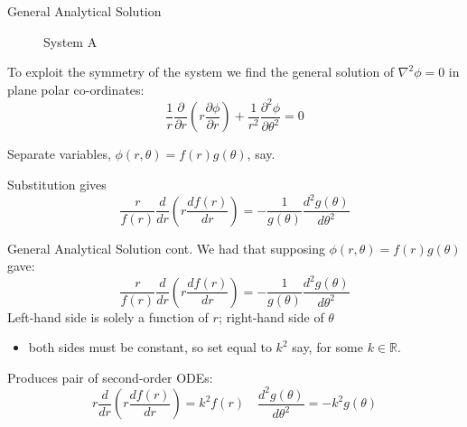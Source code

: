 \documentclass{beamer}
\newcommand{\be}{\begin{equation}}
\newcommand{\ee}{\end{equation}}
\begin{document}
\begin{frame}{General Analytical Solution}
\begin{figure}
\centering
	\caption{System A}
\end{figure}

To exploit the symmetry of the system we find the general solution of $\nabla^2 \phi=0$
in plane polar co-ordinates: 
%
\be
\frac{1}{r}\frac{\partial}{\partial r}(r \frac{\partial \phi}{\partial r}) + \frac{1}{r^2}\frac{\partial ^2 \phi}{\partial \theta^2} = 0 
\ee

Separate variables, $\phi(r,\theta)=f(r)g(\theta)$, say.

Substitution gives
%
\be
\frac{r}{f(r)}\frac{d}{dr}(r \frac{df(r)}{dr}) =- \frac{1}{g(\theta)}\frac{d^2 g(\theta)}{d \theta^2}
\ee

\end{frame}

\begin{frame}{General Analytical Solution cont.}
We had that supposing $\phi(r,\theta)=f(r)g(\theta)$ gave:
%
\be
\frac{r}{f(r)}\frac{d}{dr}(r \frac{df(r)}{dr}) =- \frac{1}{g(\theta)}\frac{d^2 g(\theta)}{d \theta^2}
\ee
%
Left-hand side is solely a function of $r$; right-hand side of $\theta$ 
\begin{itemize}
\item both sides must be constant, so set equal to $k^2$ say, for some $k \in \mathbb{R}$.
\end{itemize}

Produces pair of second-order ODEs:
%
\be
r\frac{d}{dr}(r \frac{df(r)}{dr}) = k^2 f(r) \quad \frac{d^2 g(\theta)}{d\theta^2} = -k^2 g(\theta)
\ee

\end{frame}
\end{document}
